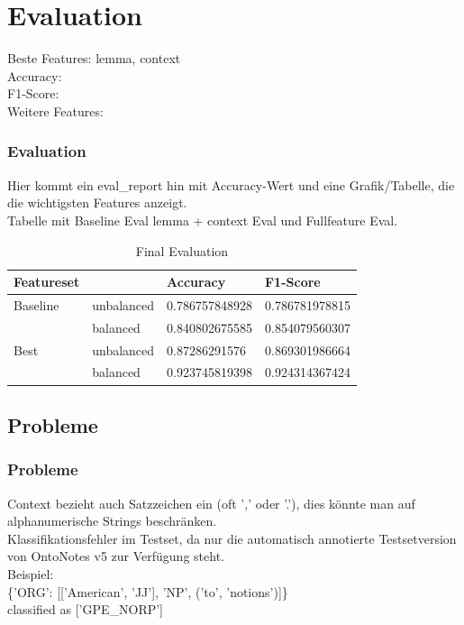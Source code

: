 \documentclass{beamer}
\begin{document}
\section{Evaluation}
	\begin{frame}
		Beste Features: lemma, context\\
		Accuracy: \\
		F1-Score:\\
		Weitere Features:\\
	\end{frame}
	\begin{frame}
		\frametitle{Evaluation}
		Hier kommt ein eval\_report hin mit Accuracy-Wert und eine Grafik/Tabelle, die die wichtigsten Features anzeigt.\\
		Tabelle mit Baseline Eval lemma + context Eval und Fullfeature Eval.\\
				\begin{table}
					\caption{Final Evaluation}
					\begin{tabularx}{\textwidth}{llll}
						Featureset & & Accuracy & F1-Score\\
						\toprule
						Baseline & unbalanced & 0.786757848928 &  0.786781978815\\
								 & balanced & 0.840802675585 & 0.854079560307\\
						Best	 & unbalanced & 0.87286291576 & 0.869301986664\\
								 & balanced & 0.923745819398 & 0.924314367424\\
						\bottomrule
					\end{tabularx}
					\label{tab:allf2}
				\end{table}	
		
		
		
		
	\end{frame}
		\subsection{Probleme}
		\begin{frame}
			\frametitle{Probleme}
			Context bezieht auch Satzzeichen ein (oft ',' oder '.'), dies könnte man auf alphanumerische Strings beschränken.\\
			
			Klassifikationsfehler im Testset, da nur die automatisch annotierte Testsetversion von OntoNotes v5 zur Verfügung steht.\\
			
			Beispiel:\\
			\{'ORG': [['American', 'JJ'], 'NP', ('to', 'notions')]\}\\classified as ['GPE\_NORP']\\
			
		\end{frame}
\end{document}
